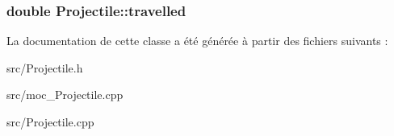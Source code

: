 \label{classProjectile_ae5273bd2c6550b94f38310b69859b093}
\hypertarget{classProjectile_a0fc0c0258f36a9347f45d1edb8b767e5}{
\subsubsection[{travelled}]{\setlength{\rightskip}{0pt plus 5cm}double {\bf Projectile::travelled}}}
\label{classProjectile_a0fc0c0258f36a9347f45d1edb8b767e5}


La documentation de cette classe a été générée à partir des fichiers suivants :\begin{DoxyCompactItemize}
\item 
src/Projectile.h\item 
src/moc\_\-Projectile.cpp\item 
src/Projectile.cpp\end{DoxyCompactItemize}
